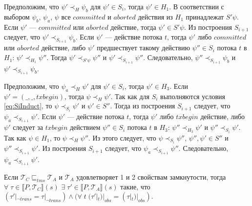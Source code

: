 \begin{myproof}
\begin{itemize}
Предположим, что $\psi' \prec_{H} \psi_b$ для $\psi' \in S_i$, тогда $\psi' \in H_1$. В соответствии с выбором $\psi_b$, $\psi_a$, $\psi$ все $committed$ и $aborted$ действия из $H_1$ принадлежат $S'\psi$. Если $\psi'$ --- $committed$ или $aborted$ действие, тогда $\psi' \in S'\psi$. Из построения $S_{i+1}$ следует, что $\psi' \prec_{S_{i+1}} \psi_b$. Если $\psi'$ --- действие потока $t$, тогда $\psi'$ либо $committed$ или $aborted$ действие, либо $\psi'$ предшествует такому действию $\psi'' \in S_i$ потока $t$ в $H_1$: $\psi' \prec_{H_1} \psi''$. Тогда $\psi' \prec_{S'\psi} \psi''$ и $\psi' \prec_{S_{i+1}} \psi''$. Следовательно, $\psi'' \prec_{S_{i+1}} \psi_b$ и $\psi' \prec_{S_{i+1}} \psi_b$. 

Предположим, что $\psi_a \prec_{H} \psi'$ для $\psi' \in S_i$, тогда $\psi' \in H_3$. Если $\psi' = (\_,\_, txbegin)$, тогда $\psi \prec_{H} \psi'$. Так как для $S_i$ выполняются условия \eqref{eq:SiInduct}, то $\psi \prec_{S_i} \psi'$ и $\psi' \in S''$. Тогда из построения $S_{i+1}$ следует, что $\psi_a \prec_{S_{i+1}} \psi'$. Если $\psi'$ --- действие потока $t$, тогда $\psi'$ либо $txbegin$ действие, либо $\psi'$ следует за $txbegin$ действием $\psi'' \in S_i$ потока $t$ в $H_3$: $\psi'' \prec_{H_3} \psi'$ и $\psi'' \prec_{S_i} \psi'$. Так как $\psi \in H_1$, то $\psi \prec_H \psi''$. Из этого следует, что $\psi \prec_{S_i} \psi''$, $\psi'', \psi' \in S''$ и $\psi'' \prec_{S_{i+1}} \psi'$. Из построения $S_{i+1}$ следует, что $\psi_a \prec_{S_{i+1}} \psi''$. Следовательно, $\psi_a \prec_{S_{i+1}} \psi'$. 
\end{itemize}

\end{myproof}
\begin{lemma}\label{sufficiency5}
Если $\mathcal{T}_C \sqsubseteq_{tms} \mathcal{T}_A$ и $\mathcal{T}_A$ удовлетворяет 1 и 2 свойствам замкнутости, тогда $\forall \; \tau \in \llbracket P, \mathcal{T}_C\rrbracket(s)$ $\exists \; \tau' \in \llbracket P, \mathcal{T}_A \rrbracket(s)$ такие, что $(\tau'|_{\neg trans} = \tau|_{\neg trans}) \land (\forall \; t \; (\tau'|_t)|_{obs} = (\tau|_t)|_{obs})$.\end{lemma}
